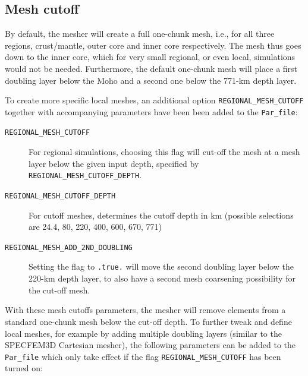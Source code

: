 \subsection{Mesh cutoff}\label{sec:Mesh-cutoff}

By default, the mesher will create a full one-chunk mesh, i.e., for all three regions, crust/mantle, outer core and inner core respectively.
The mesh thus goes down to the inner core, which for very small regional, or even local, simulations would not be needed.
Furthermore, the default one-chunk mesh will place a first doubling layer below the Moho and a second one below the 771-km depth layer.\newline

To create more specific local meshes, an additional option \texttt{REGIONAL\_MESH\_CUTOFF} together with accompanying parameters have been been added to the \texttt{Par\_file}:
\begin{description}
%
\item [{\texttt{REGIONAL\_MESH\_CUTOFF}}] For regional simulations, choosing this flag will cut-off the mesh at a mesh layer
below the given input depth, specified by \texttt{REGIONAL\_MESH\_CUTOFF\_DEPTH}.
%
\item [{\texttt{REGIONAL\_MESH\_CUTOFF\_DEPTH}}] For cutoff meshes, determines the cutoff depth in km (possible selections are 24.4, 80, 220, 400, 600, 670, 771)
%
\item [{\texttt{REGIONAL\_MESH\_ADD\_2ND\_DOUBLING}}] Setting the flag to \texttt{.true.} will move the second doubling layer below the
220-km depth layer, to also have a second mesh coarsening possibility for the cut-off mesh.
%
\end{description}

With these mesh cutoffs parameters, the mesher will remove elements from a standard one-chunk mesh below the cut-off depth. To further tweak and define local meshes, for example by adding multiple doubling layers (similar to the SPECFEM3D Cartesian mesher), the following parameters can be added to the \texttt{Par\_file} which only take effect if the flag \texttt{REGIONAL\_MESH\_CUTOFF} has been turned on:

